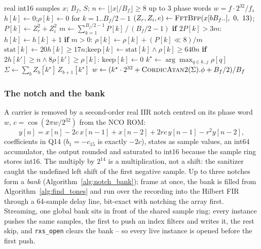 \begin{algorithm}[H]
\caption{Stationary-carrier finder, frame at once (float, fixed and C; integer arithmetic shown).}
\label{alg:find_tones}
\begin{algorithmic}[1]
\Require real int16 samples $x$; $B_f$, $S$; $n \gets \lfloor |x| / B_f \rfloor \ge 8$
\Ensure up to 3 phase words $w = f \cdot 2^{32} / f_s$
\State $h[k] \gets 0$;\quad $\rho[k] \gets 0$ for $k = 1 .. B_f/2 - 1$
 
    \State $(Z_r, Z_i, e) \gets \textsc{FftBfp}(x[bB_f..],\ 0,\ 13)$;\quad $P[k] \gets Z_r^2 + Z_i^2$
    \State $m \gets \sum_{k=1}^{B_f/2-1} P[k] \,/\, (B_f/2 - 1)$ 
        \State \textbf{if} $2 P[k] > 3 m$: $h[k] \gets h[k] + 1$ 
        \State \textbf{if} $m > 0$: $\rho[k] \gets \rho[k] + (P[k] \ll 8) / m$ 
    \EndFor
\EndFor
\State $\mathrm{stat}[k] \gets 20 h[k] \ge 17 n$;\quad $\mathrm{keep}[k] \gets \mathrm{stat}[k] \wedge \rho[k] \ge 640 n$ 
 
        \State \textbf{if} $2 h[k'] \ge n \wedge 8 \rho[k'] \ge \rho[k]$: $\mathrm{keep}[k] \gets 0$ 
    \EndFor
\EndFor
{}
    \State $k^\star \gets \arg\max_{q \in k..j} \rho[q]$ 
    \State $\Sigma \gets \sum_{b} \overline{Z_b[k^\star]}\, Z_{b+1}[k^\star]$ 
    \State $w \gets (k^\star \cdot 2^{32} + \textsc{CordicAtan2}(\Sigma).\phi + B_f/2) / B_f$ 
\EndFor
\end{algorithmic}
\end{algorithm}

\subsubsection*{The notch and the bank}

A carrier is removed by a second-order real IIR notch centred on its
phase word $w$, $c = \cos(2\pi w / 2^{32})$ from the NCO ROM:
\[
y[n] = x[n] - 2c\,x[n{-}1] + x[n{-}2] + 2rc\,y[n{-}1] - r^2 y[n{-}2],
\]
coefficients in Q14 ($b_1 = -c_{15}$ is exactly $-2c$), states as
sample values, an int64 accumulator, the output rounded and saturated
to int16 because the sample ring stores int16.  The multiply by
$2^{14}$ is a multiplication, not a shift: the sanitizer caught the
undefined left shift of the first negative sample.  Up to three
notches form a \emph{bank} (Algorithm~\ref{alg:notch_bank}); frame at
once, the bank is filled from Algorithm~\ref{alg:find_tones} and run
over the recording into the Hilbert FIR through a 64-sample delay
line, bit-exact with notching the array first.  Streaming, one global
bank sits in front of the shared sample ring: every instance pushes
the same samples, the first to push an index filters and writes it,
the rest skip, and \texttt{rxs\_open} clears the bank -- so every live
instance is opened before the first push.

